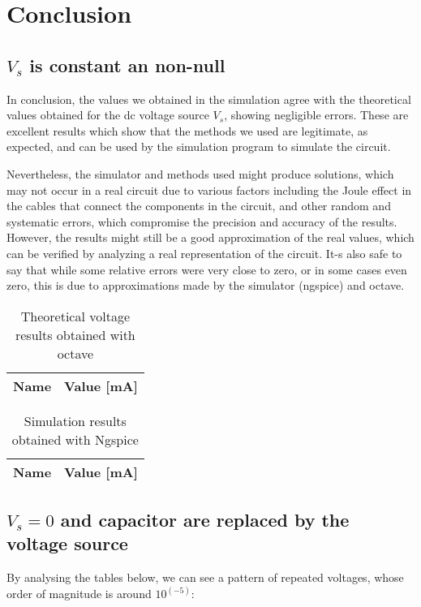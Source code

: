 \section{Conclusion}
\label{sec:conclusion}
\subsection{$V_s$ is constant an non-null}

	In conclusion, the values we obtained in the simulation agree with the theoretical values obtained for the dc voltage source $V_s$, showing negligible errors. These are excellent results which show that the methods we used are legitimate, as expected, and can be used by the simulation program to simulate the circuit.
	
Nevertheless, the simulator and methods used might produce solutions, which may not occur in a real circuit due to various factors including the Joule effect in the cables that connect the components in the circuit, and other random and systematic errors, which compromise the precision and accuracy of the results. However, the results might still be a good approximation of the real values, which can be verified by analyzing a real representation of the circuit. It-s also safe to say that while some relative errors were very close to zero, or in some cases even zero, this is due to approximations made by the simulator (ngspice) and octave.

\begin{table}[H]
	\centering
	\begin{tabular}{|l|r|}
		\hline    
		{\bf Name} & {\bf Value [mA]} \\ \hline
		
	\end{tabular}
	\caption{Theoretical voltage results obtained with octave}
	\label{tab:op}
\end{table}

\begin{table}[H]
	\centering
	\begin{tabular}{|l|r|}
		\hline    
		{\bf Name} & {\bf Value [mA]} \\ \hline
		
	\end{tabular}
	\caption{Simulation results obtained with Ngspice}
	\label{tab:op}
\end{table}

\subsection{$V_s = 0$ and capacitor are replaced by the voltage source}
By analysing the tables below, we can see a pattern of repeated voltages, whose order of magnitude is around $10^(-5)$:

